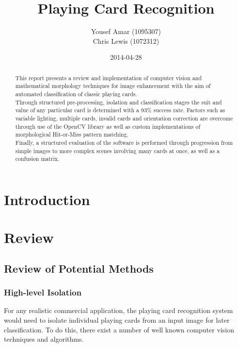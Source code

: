 \documentclass[a4paper,12pt,notitlepage]{article}
\begin{document}
\parskip 2mm

\title{{\huge Playing Card Recognition}\\}
\author{Yousef Amar (1095307)\\Chris Lewis (1072312)}
\date{2014-04-28}
\maketitle
\thispagestyle{empty}
\vfill
\begin{abstract}
	This report presents a review and implementation of computer vision and mathematical morphology techniques for image enhancement with the aim of automated classification of classic playing cards.\\[4px]
	Through structured pre-processing, isolation and classification stages the suit and value of any particular card is determined with a 93\% success rate. Factors such as variable lighting, multiple cards, invalid cards and orientation correction are overcome through use of the OpenCV library as well as custom implementations of morphological Hit-or-Miss pattern matching.\\[4px]
	Finally, a structured evaluation of the software is performed through progression from simple images to more complex scenes involving many cards at once, as well as a confusion matrix.
\end{abstract}
\pagebreak
{}
\tableofcontents
\thispagestyle{empty}
\pagebreak
\setcounter{page}{1}

\parskip 2mm
\section{Introduction}
	

\pagebreak
\section{Review}
	\label{sec:review}
	\subsection{Review of Potential Methods}
		\subsubsection{High-level Isolation}
			For any realistic commercial application, the playing card recognition system would need to isolate individual playing cards from an input image for later classification. To do this, there exist a number of well known computer vision techniques and algorithms.
\end{document}
